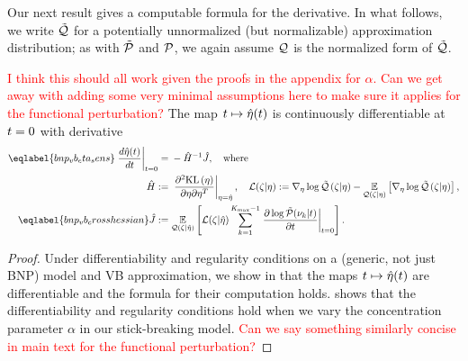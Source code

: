 Our next result gives a computable formula for the derivative. In what follows, we write $\tilde{\mathcal{Q}}$ for a potentially unnormalized (but normalizable) approximation distribution; as with $\tilde{\mathcal{P}}$ and $\mathcal{P}$, we again assume $\mathcal{Q}$ is the normalized form of $\tilde{\mathcal{Q}}$.
%
\begin{thm}
%
\textcolor{red}{I think this should all work given the proofs in the appendix for $\alpha$. Can we get away with adding some very minimal assumptions here to make sure it applies for the functional perturbation?}
The map $t \mapsto
\hat\eta(t)$ is continuously differentiable at $t=0$ with derivative
%
\begin{align}
%
\eqlabel{bnp_vb_eta_sens}
\fracat{d \etaopt(\t)}{d \t}{\t=0} ={}&
    - \hessopt^{-1} \crosshessian, \mathwhere \\
%
\hessopt :={}& \fracat{\partial^2 \KL{\eta}}
                      {\partial \eta \partial \eta^T}
                      {\eta = \etaopt},
\quad \lqgradbar{\zeta \vert \eta} :={}
    \lqgrad{\zeta \vert \eta} -
    \expect{\q(\zeta \vert \eta)}{\lqgrad{\zeta \vert \eta}}, \\
%
\eqlabel{bnp_vb_crosshessian}
\crosshessian :={}&
    \expect{\q(\zeta \vert \etaopt)}{
          \lqgradbar{\zeta \vert \etaopt}
          \sum_{k=1}^{\kmax-1}
          \fracat{\partial \log \ptil(\nu_k \vert \t)}
                 {\partial \t}{\t=0}}.
%
\end{align}
%
\end{thm}
%
\begin{proof}
Under differentiability and regularity conditions on a (generic, not just BNP) model and VB approximation, we show in  that the maps $t \mapsto \hat\eta(t)$ are differentiable and the formula for their computation holds.  shows that the differentiability and regularity conditions hold when we vary the concentration parameter $\alpha$ in our stick-breaking model. \textcolor{red}{Can we say something similarly concise in main text for the functional perturbation?}
\end{proof}
%

